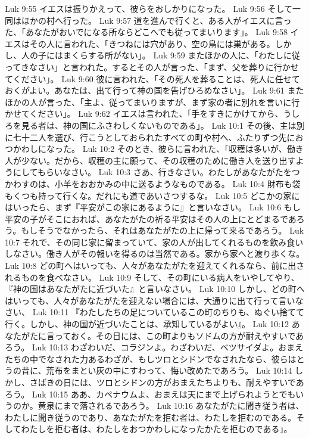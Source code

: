 Luk 9:55  イエスは振りかえって、彼らをおしかりになった。
Luk 9:56  そして一同はほかの村へ行った。
Luk 9:57  道を進んで行くと、ある人がイエスに言った、「あなたがおいでになる所ならどこへでも従ってまいります」。
Luk 9:58  イエスはその人に言われた、「きつねには穴があり、空の鳥には巣がある。しかし、人の子にはまくらする所がない」。
Luk 9:59  またほかの人に、「わたしに従ってきなさい」と言われた。するとその人が言った、「まず、父を葬りに行かせてください」。
Luk 9:60  彼に言われた、「その死人を葬ることは、死人に任せておくがよい。あなたは、出て行って神の国を告げひろめなさい」。
Luk 9:61  またほかの人が言った、「主よ、従ってまいりますが、まず家の者に別れを言いに行かせてください」。
Luk 9:62  イエスは言われた、「手をすきにかけてから、うしろを見る者は、神の国にふさわしくないものである」。
Luk 10:1  その後、主は別に七十二人を選び、行こうとしておられたすべての町や村へ、ふたりずつ先におつかわしになった。
Luk 10:2  そのとき、彼らに言われた、「収穫は多いが、働き人が少ない。だから、収穫の主に願って、その収穫のために働き人を送り出すようにしてもらいなさい。
Luk 10:3  さあ、行きなさい。わたしがあなたがたをつかわすのは、小羊をおおかみの中に送るようなものである。
Luk 10:4  財布も袋もくつも持って行くな。だれにも道であいさつするな。
Luk 10:5  どこかの家にはいったら、まず『平安がこの家にあるように』と言いなさい。
Luk 10:6  もし平安の子がそこにおれば、あなたがたの祈る平安はその人の上にとどまるであろう。もしそうでなかったら、それはあなたがたの上に帰って来るであろう。
Luk 10:7  それで、その同じ家に留まっていて、家の人が出してくれるものを飲み食いしなさい。働き人がその報いを得るのは当然である。家から家へと渡り歩くな。
Luk 10:8  どの町へはいっても、人々があなたがたを迎えてくれるなら、前に出されるものを食べなさい。
Luk 10:9  そして、その町にいる病人をいやしてやり、『神の国はあなたがたに近づいた』と言いなさい。
Luk 10:10  しかし、どの町へはいっても、人々があなたがたを迎えない場合には、大通りに出て行って言いなさい、
Luk 10:11  『わたしたちの足についているこの町のちりも、ぬぐい捨てて行く。しかし、神の国が近づいたことは、承知しているがよい』。
Luk 10:12  あなたがたに言っておく。その日には、この町よりもソドムの方が耐えやすいであろう。
Luk 10:13  わざわいだ、コラジンよ。わざわいだ、ベツサイダよ。おまえたちの中でなされた力あるわざが、もしツロとシドンでなされたなら、彼らはとうの昔に、荒布をまとい灰の中にすわって、悔い改めたであろう。
Luk 10:14  しかし、さばきの日には、ツロとシドンの方がおまえたちよりも、耐えやすいであろう。
Luk 10:15  ああ、カペナウムよ、おまえは天にまで上げられようとでもいうのか。黄泉にまで落されるであろう。
Luk 10:16  あなたがたに聞き従う者は、わたしに聞き従うのであり、あなたがたを拒む者は、わたしを拒むのである。そしてわたしを拒む者は、わたしをおつかわしになったかたを拒むのである」。
